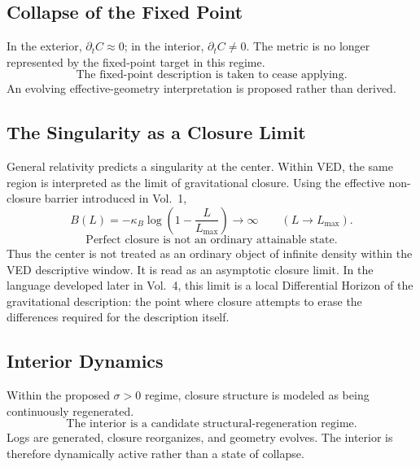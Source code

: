 \subsection{Collapse of the Fixed Point}

In the exterior, $\partial_t C \approx 0$;
in the interior, $\partial_t C \neq 0$.
The metric is no longer represented by the fixed-point target in this regime.
\begin{equation}
  \boxed{\text{The fixed-point description is taken to cease applying.}}
\end{equation}
An evolving effective-geometry interpretation is proposed rather than derived.

\subsection{The Singularity as a Closure Limit}

General relativity predicts a singularity at the center.
Within VED,
the same region is interpreted as the limit of gravitational closure.
Using the effective non-closure barrier introduced in Vol.~1,
\begin{equation}
  B(L) = -\kappa_B \log\!\left(1 - \frac{L}{L_{\max}}\right)
  \to \infty
  \qquad (L \to L_{\max}).
\end{equation}
\begin{equation}
  \boxed{\text{Perfect closure is not an ordinary attainable state.}}
\end{equation}
Thus the center is not treated as an ordinary object of infinite density
within the VED descriptive window.
It is read as an asymptotic closure limit.
In the language developed later in Vol.~4,
this limit is a local Differential Horizon of the gravitational
description:
the point where closure attempts to erase the differences required
for the description itself.

\subsection{Interior Dynamics}

Within the proposed $\sigma>0$ regime, closure structure is modeled as being
continuously regenerated.
\begin{equation}
  \boxed{\text{The interior is a candidate structural-regeneration regime.}}
\end{equation}
Logs are generated, closure reorganizes, and geometry evolves.
The interior is therefore dynamically active rather than a state of collapse.

